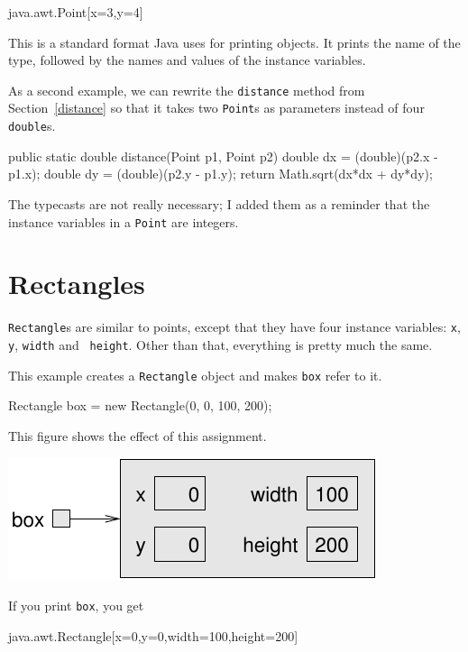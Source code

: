 \begin{code}
java.awt.Point[x=3,y=4]
\end{code}

This is a standard format Java uses for printing objects.  It prints
the name of the type, followed by the names and values of the instance
variables.

As a second example, we can rewrite the {\tt distance} method from
Section~\ref{distance} so that it takes two {\tt Point}s as parameters
instead of four {\tt double}s.

\begin{code}
  public static double distance(Point p1, Point p2) {
    double dx = (double)(p2.x - p1.x);
    double dy = (double)(p2.y - p1.y);
    return Math.sqrt(dx*dx + dy*dy);
  }
\end{code}

The typecasts are not really necessary; I added them as a
reminder that the instance variables in a {\tt Point} are integers.


\section{Rectangles}

{\tt Rectangle}s are similar to points, except that they have four
instance variables: {\tt x}, {\tt y}, {\tt width} and {\tt
height}.  Other than that, everything is pretty much the same.

This example
creates a {\tt Rectangle} object and makes {\tt box} refer to it.

\begin{code}
    Rectangle box = new Rectangle(0, 0, 100, 200);
\end{code}

This figure shows the effect of this assignment.


\includegraphics{figs/rectangle.pdf}

If you print {\tt box}, you get

\begin{code}
java.awt.Rectangle[x=0,y=0,width=100,height=200]
\end{code}

